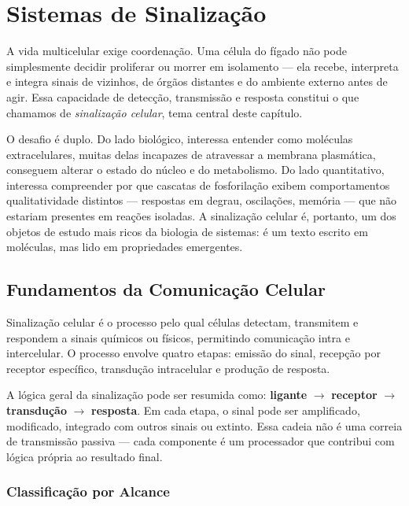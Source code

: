 
\chapter{Sistemas de Sinalização}
\label{cap:09}

A vida multicelular exige coordenação. Uma célula do fígado não pode simplesmente
decidir proliferar ou morrer em isolamento --- ela recebe, interpreta e integra
sinais de vizinhos, de órgãos distantes e do ambiente externo antes de agir. Essa
capacidade de detecção, transmissão e resposta constitui o que chamamos de
\emph{sinalização celular}, tema central deste capítulo.

O desafio é duplo. Do lado biológico, interessa entender como moléculas
extracelulares, muitas delas incapazes de atravessar a membrana plasmática,
conseguem alterar o estado do núcleo e do metabolismo. Do lado quantitativo,
interessa compreender por que cascatas de fosforilação exibem comportamentos
qualitatividade distintos --- respostas em degrau, oscilações, memória --- que
não estariam presentes em reações isoladas. A sinalização celular é, portanto,
um dos objetos de estudo mais ricos da biologia de sistemas: é um texto escrito
em moléculas, mas lido em propriedades emergentes.

\section{Fundamentos da Comunicação Celular}
\label{sec:09-fundamentos}

\begin{definicaoenv}
Sinalização celular é o processo pelo qual células detectam, transmitem e
respondem a sinais químicos ou físicos, permitindo comunicação intra e
intercelular. O processo envolve quatro etapas: emissão do sinal, recepção por
receptor específico, transdução intracelular e produção de resposta.
\end{definicaoenv}

A lógica geral da sinalização pode ser resumida como: \textbf{ligante}
$\rightarrow$ \textbf{receptor} $\rightarrow$ \textbf{transdução} $\rightarrow$
\textbf{resposta}. Em cada etapa, o sinal pode ser amplificado, modificado,
integrado com outros sinais ou extinto. Essa cadeia não é uma correia de
transmissão passiva --- cada componente é um processador que contribui com
lógica própria ao resultado final.

\subsection{Classificação por Alcance}
\label{subsec:09-alcance}


